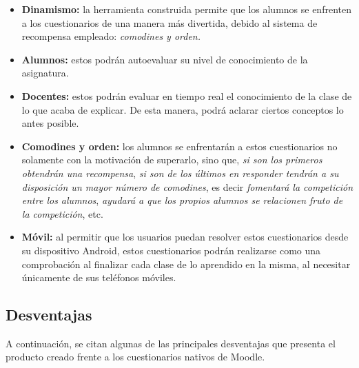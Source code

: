 \begin{itemize}
	\item \textbf{Dinamismo:} la herramienta construida permite que los alumnos se enfrenten a los cuestionarios de una manera más divertida, debido al sistema de recompensa empleado: \emph{comodines y orden.}
	
	\item \textbf{Alumnos:} estos podrán autoevaluar su nivel de conocimiento de la asignatura.
	
	\item \textbf{Docentes:} estos podrán evaluar en tiempo real el conocimiento de la clase de lo que acaba de explicar. De esta manera, podrá aclarar ciertos conceptos lo antes posible.
	
	\item \textbf{Comodines y orden:} los alumnos se enfrentarán a estos cuestionarios no solamente con la motivación de superarlo, sino que, \emph{si son los primeros obtendrán una recompensa}, \emph{si son de los últimos en responder tendrán a su disposición un mayor número de comodines}, es decir \emph{fomentará la competición entre los alumnos}, \emph{ayudará a que los propios alumnos se relacionen fruto de la competición}, etc.
	
	\item \textbf{Móvil:} al permitir que los usuarios puedan resolver estos cuestionarios desde su dispositivo Android, estos cuestionarios podrán realizarse como una comprobación al finalizar cada clase de lo aprendido en la misma, al necesitar únicamente de sus teléfonos móviles.
	
	
\end{itemize}

\subsection{Desventajas}

A continuación, se citan algunas de las principales desventajas que presenta  el producto creado frente a los cuestionarios nativos de Moodle.

